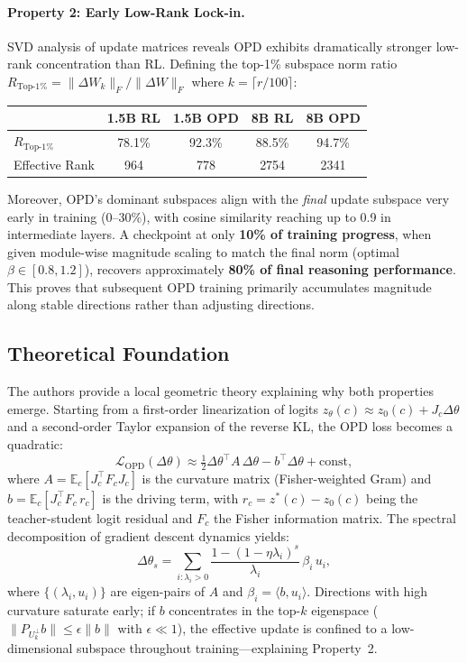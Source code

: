 \documentclass[11pt,a4paper]{article}
\begin{document}
\paragraph{Property 2: Early Low-Rank Lock-in.}
SVD analysis of update matrices reveals OPD exhibits dramatically stronger low-rank concentration than RL. Defining the top-1\% subspace norm ratio $R_{\mathrm{Top\text{-}1\%}} = \|{\Delta W_k}\|_F / \|{\Delta W}\|_F$ where $k = \lceil r/100 \rceil$:

\begin{center}
\begin{tabular}{lcccc}
\toprule
& 1.5B RL & 1.5B OPD & 8B RL & 8B OPD \\
\midrule
$R_{\mathrm{Top\text{-}1\%}}$ & 78.1\% & 92.3\% & 88.5\% & 94.7\% \\
Effective Rank & 964 & 778 & 2754 & 2341 \\
\bottomrule
\end{tabular}
\end{center}

Moreover, OPD's dominant subspaces align with the \textit{final} update subspace very early in training (0--30\%), with cosine similarity reaching up to 0.9 in intermediate layers. A checkpoint at only \textbf{10\% of training progress}, when given module-wise magnitude scaling to match the final norm (optimal $\beta \in [0.8, 1.2]$), recovers approximately \textbf{80\% of final reasoning performance}. This proves that subsequent OPD training primarily accumulates magnitude along stable directions rather than adjusting directions.

\subsection{Theoretical Foundation}

The authors provide a local geometric theory explaining why both properties emerge. Starting from a first-order linearization of logits $z_\theta(c) \approx z_0(c) + J_c \Delta\theta$ and a second-order Taylor expansion of the reverse KL, the OPD loss becomes a quadratic:
\begin{equation}
\mathcal{L}_{\mathrm{OPD}}(\Delta\theta) \approx \tfrac{1}{2}\Delta\theta^\top A\,\Delta\theta - b^\top\Delta\theta + \mathrm{const},
\end{equation}
where $A = \mathbb{E}_c[J_c^\top F_c J_c]$ is the curvature matrix (Fisher-weighted Gram) and $b = \mathbb{E}_c[J_c^\top F_c\, r_c]$ is the driving term, with $r_c = z^*(c) - z_0(c)$ being the teacher-student logit residual and $F_c$ the Fisher information matrix. The spectral decomposition of gradient descent dynamics yields:
\begin{equation}
\Delta\theta_s = \sum_{i:\lambda_i > 0} \frac{1 - (1-\eta\lambda_i)^s}{\lambda_i}\,\beta_i\, u_i,
\end{equation}
where $\{(\lambda_i, u_i)\}$ are eigen-pairs of $A$ and $\beta_i = \langle b, u_i\rangle$. Directions with high curvature saturate early; if $b$ concentrates in the top-$k$ eigenspace ($\|P_{U_k^\perp} b\| \leq \epsilon\|b\|$ with $\epsilon \ll 1$), the effective update is confined to a low-dimensional subspace throughout training---explaining Property~2.
\end{document}
